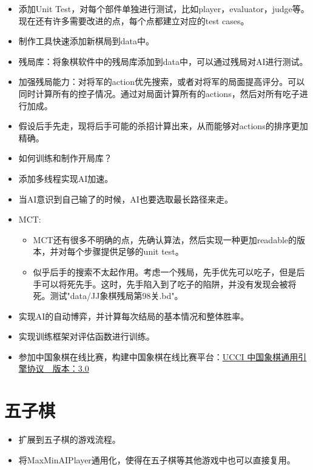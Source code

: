 \documentclass[export, 12pt, letterpaper]{ctexrep}
\begin{document}
\begin{itemize}
\item{ 添加Unit Test，对每个部件单独进行测试，比如player，evaluator，judge等。现在还有许多需要改进的点，每个点都建立对应的test cases。 }
\item{ 制作工具快速添加新棋局到data中。 }
\item{ 残局库：将象棋软件中的残局库添加到data中，可以通过残局对AI进行测试。 }
\item{ 加强残局能力：对将军的action优先搜索，或者对将军的局面提高评分。可以同时计算所有的控子情况。通过对局面计算所有的actions，然后对所有吃子进行加成。 }
\item{ 假设后手先走，现将后手可能的杀招计算出来，从而能够对actions的排序更加精确。 }
\item{ 如何训练和制作开局库？ }
\item{ 添加多线程实现AI加速。 }
\item{ 当AI意识到自己输了的时候，AI也要选取最长路径来走。 }
\item{ MCT:
\begin{itemize}
\item{ MCT还有很多不明确的点，先确认算法，然后实现一种更加readable的版本，并对每个步骤提供足够的unit test。 }
\item{ 似乎后手的搜索不太起作用。考虑一个残局，先手优先可以吃子，但是后手可以将死先手。这时，先手陷入到了吃子的陷阱，并没有发现会被将死。测试"data/JJ象棋残局第98关.bd"。 }
\end{itemize}
 }
\item{ 实现AI的自动博弈，并计算每次结局的基本情况和整体胜率。 }
\item{ 实现训练框架对评估函数进行训练。 }
\item{ 参加中国象棋在线比赛，构建中国象棋在线比赛平台：\href{https://www.xqbase.com/protocol/cchess_ucci.htm}{UCCI 中国象棋通用引擎协议　版本：3.0} }
\end{itemize}



\section{五子棋}


\begin{itemize}
\item{ 扩展到五子棋的游戏流程。 }
\item{ 将MaxMinAIPlayer通用化，使得在五子棋等其他游戏中也可以直接复用。 }
\end{itemize}
\end{document}
